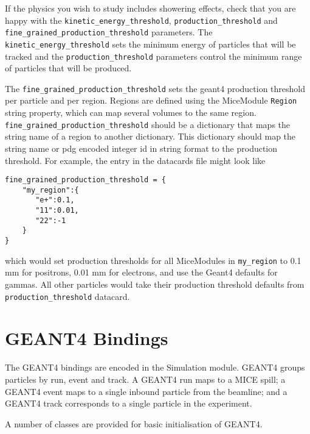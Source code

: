 If the physics you wish to study includes showering effects, check that you are happy with the \verb|kinetic_energy_threshold|, \verb|production_threshold| and \verb|fine_grained_production_threshold| parameters. The \verb|kinetic_energy_threshold| sets the minimum energy of particles that will be tracked and the \verb|production_threshold| parameters control the minimum range of particles that will be produced. 

The \verb|fine_grained_production_threshold| sets the geant4 production threshold per particle and per region. Regions are defined using the MiceModule \verb|Region| string property, which can map several volumes to the same region. \verb|fine_grained_production_threshold| should be a dictionary that maps the string name of a region to another dictionary. This dictionary should map the string name or pdg encoded integer id in string format to the production threshold. For example, the entry in the datacards file might look like
\begin{verbatim}
fine_grained_production_threshold = {
    "my_region":{
       "e+":0.1,
       "11":0.01,
       "22":-1
    }
}
\end{verbatim}
which would set production thresholds for all MiceModules in \verb|my_region| to 0.1 mm for positrons, 0.01 mm for electrons, and use the Geant4 defaults for gammas. All other particles would take their production threshold defaults from \verb|production_threshold| datacard.

\section{GEANT4 Bindings}
The GEANT4 bindings are encoded in the Simulation module. GEANT4 groups particles by run, event and track. A GEANT4 run maps to a MICE spill; a GEANT4 event maps to a single inbound particle from the beamline; and a GEANT4 track corresponds to a single particle in the experiment.

A number of classes are provided for basic initialisation of GEANT4.

